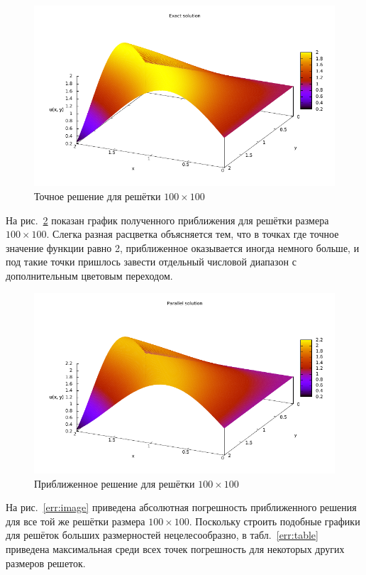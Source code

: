 \documentclass[12pt,notitlepage,oneside]{extarticle}
\begin{document}
\begin{figure}[h]
  \centering
  \includegraphics[scale=1.3]{correct_sol.pdf}
  \caption{Точное решение для решётки $100 \times 100$}
  \label{exact:image}
\end{figure}

На рис.~\ref{parallel:image} показан график полученного приближения для решётки
размера $100 \times 100$. Слегка разная расцветка объясняется тем, что в точках
где точное значение функции равно 2, приближенное оказывается иногда немного
больше, и под такие точки пришлось завести отдельный числовой диапазон с
дополнительным цветовым переходом.

\begin{figure}[h]
  \centering
  \includegraphics[scale=1.3]{mine_sol.pdf}
  \caption{Приближенное решение для решётки $100 \times 100$}
  \label{parallel:image}
\end{figure}

На рис.~\ref{err:image} приведена абсолютная погрешность приближенного решения
для все той же решётки размера $100 \times 100$. Поскольку строить подобные
графики для решёток больших размерностей нецелесообразно, в табл.~\ref{err:table}
приведена максимальная среди всех точек погрешность для некоторых других размеров
решеток.
\end{document}
